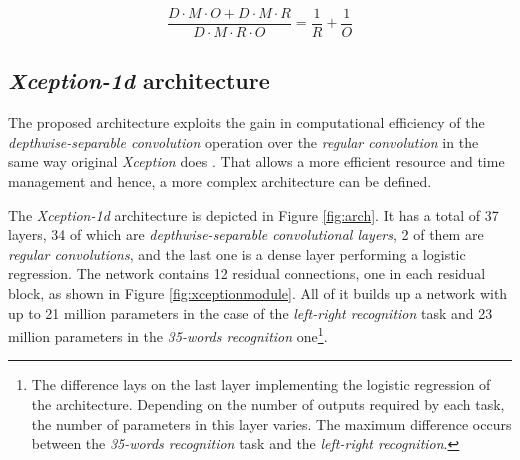 $$ \frac{D \cdot M \cdot O  + D \cdot M \cdot R} {D \cdot M \cdot R \cdot O} = \frac{1}{R} + \frac{1}{O} $$



\subsection{\textit{Xception-1d} architecture}
The proposed architecture exploits the gain in computational efficiency of the \textit{depthwise-separable convolution} operation over the \textit{regular convolution} in the same way original \textit{Xception} does \autocite{chollet2017}. That allows a more efficient resource and time management and hence, a more complex architecture can be defined.

The \textit{Xception-1d} architecture is depicted in Figure \ref{fig:arch}. It has a total of 37 layers, 34 of which are \textit{depthwise-separable convolutional layers}, 2 of them are \textit{regular convolutions}, and the last one is a dense layer performing a logistic regression. The network contains 12 residual connections, one in each residual block, as shown in Figure \ref{fig:xceptionmodule}. All of it builds up a network with up to 21 million parameters in the case of the \textit{left-right recognition}  task and 23 million parameters in the \textit{35-words recognition} one\footnote{The difference lays on the last layer implementing the logistic regression of the architecture. Depending on the number of outputs required by each task, the number of parameters in this layer varies. The maximum difference occurs between the \textit{35-words recognition} task and the \textit{left-right recognition}.}.

